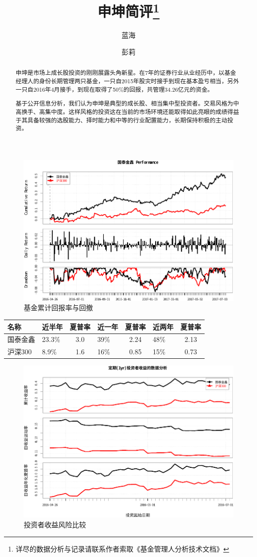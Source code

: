 \documentclass[journal=jacsat,manuscript=article]{achemso}
\author{蓝海}
\author{彭莉}
\title[申坤]{申坤简评\footnote{详尽的数据分析与记录请联系作者索取《基金管理人分析技术文档》}}
\begin{document}
\begin{abstract}
申坤是市场上成长股投资的刚刚展露头角新星。在7年的证券行业从业经历中，以基金经理人的身份长期管理两只基金，一只自2015年股灾时接手到现在基本盈亏相当，另外一只自2016年4月接手，到现在取得了50\%的回报，共管理34.26亿元的资金。

基于公开信息分析，我们认为申坤是典型的成长股、相当集中型投资者。交易风格为中高换手、高集中度。这样风格的投资这在当前的市场环境还能取得如此亮眼的成绩得益于其具备较强的选股能力、择时能力和中等的行业配置能力，长期保持积极的主动投资。
\end{abstract}
\begin{figure}[htbp]
\centering
\includegraphics{sk-review_files/figure-latex/unnamed-chunk-2-1.pdf}
\caption{基金累计回报率与回撤}
\end{figure}

\begin{longtable}[]{@{}llclclc@{}}
\toprule
名称 & 近半年 & 夏普率 & 近一年 & 夏普率 & 近两年 &
夏普率\tabularnewline
\midrule
\endhead
国泰金鑫 & 23.3\% & 3.0 & 39\% & 2.24 & 48\% & 2.13\tabularnewline
沪深300 & 8.9\% & 1.6 & 16\% & 0.85 & 15\% & 0.73\tabularnewline
\bottomrule
\end{longtable}

\begin{figure}[htbp]
\centering
\includegraphics{sk-review_files/figure-latex/unnamed-chunk-3-1.pdf}
\caption{投资者收益风险比较}
\end{figure}
\end{document}
